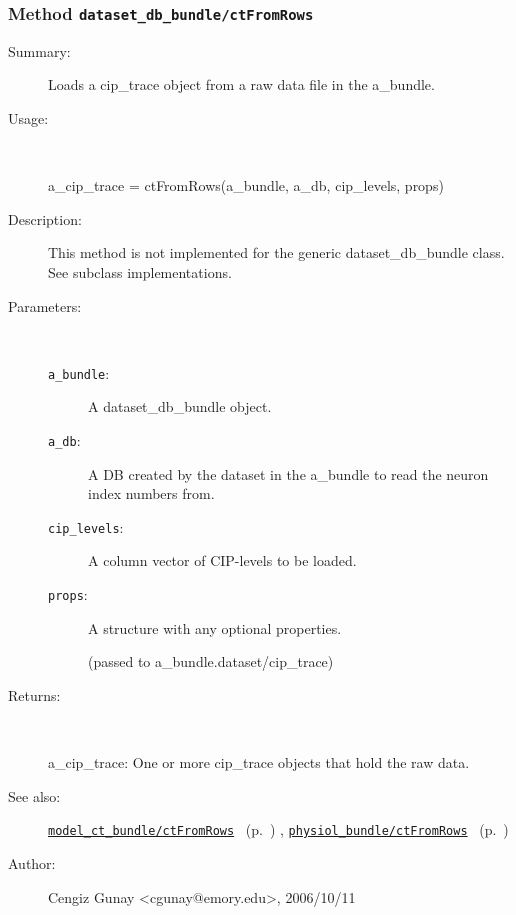 \subsubsection[Method \texttt{ctFromRows}]{Method \texttt{dataset\_db\_bundle/ctFromRows}}%
%
\label{ref_dataset_db_bundle__ctFromRows}%
\hypertarget{ref_dataset_db_bundle__ctFromRows}{}%
\begin{description}
\item[Summary:]Loads a cip\_trace object from a raw data file in the a\_bundle.
%
\item[Usage:]~%
\begin{lyxcode}%
a\_cip\_trace = ctFromRows(a\_bundle, a\_db, cip\_levels, props)
%
\end{lyxcode}%
%
\item[Description:]%
This method is not implemented for the generic dataset\_db\_bundle class. See 
 subclass implementations.
\item[Parameters:]~
\begin{description}%
\item[\texttt{a\_bundle}:]
 A dataset\_db\_bundle object.
\item[\texttt{a\_db}:]
 A DB created by the dataset in the a\_bundle to read the neuron index numbers from.
\item[\texttt{cip\_levels}:]
 A column vector of CIP-levels to be loaded.
\item[\texttt{props}:]
 A structure with any optional properties.

(passed to a\_bundle.dataset/cip\_trace)
\end{description}%
%
\item[Returns:
]~

	a\_cip\_trace: One or more cip\_trace objects that hold the raw data.
%
%
\item[See also:]%
\hyperlink{ref_model_ct_bundle__ctFromRows}{\texttt{model\_ct\_bundle/ctFromRows}}%
\ (p.~\pageref{ref_model_ct_bundle__ctFromRows})%
%
, \hyperlink{ref_physiol_bundle__ctFromRows}{\texttt{physiol\_bundle/ctFromRows}}%
\ (p.~\pageref{ref_physiol_bundle__ctFromRows})%
%
%
\item[Author:]%
Cengiz Gunay <cgunay@emory.edu>, 2006/10/11
%
\end{description}
\methodline%
